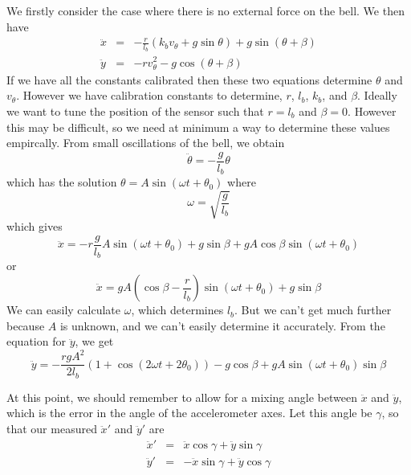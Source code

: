 \documentclass{article}
\begin{document}
We firstly consider the case where there is no external force on the bell. We then have
\begin{eqnarray}
\ddot{x} &=& -\frac{r}{l_b} \left(k_b v_\theta + g\sin \theta \right) 
   + g \sin (\theta + \beta) \\
\ddot{y} &=& -r v_\theta^2 - g \cos (\theta  + \beta)
\end{eqnarray}
If we have all the constants calibrated then these two equations determine $\theta$
and $v_\theta$. However we have calibration constants to determine, $r$, $l_b$,
$k_b$, and $\beta$. Ideally we want to tune the position of the sensor such that
$r = l_b$ and $\beta = 0$. However this may be difficult, so we need at minimum
a way to determine these values empircally.
From small oscillations of the bell, we obtain
\begin{equation}
\ddot{\theta} = - \frac{g}{l_b} \theta
\end{equation}
which has the solution $\theta = A \sin (\omega t + \theta_0)$
where
\begin{equation}
\omega = \sqrt{\frac{g}{l_b}}
\end{equation}
which gives
\begin{equation}
\ddot{x} = - r \frac{g}{l_b} A \sin (\omega t + \theta_0) + g \sin\beta 
+ g A \cos \beta \sin (\omega t + \theta_0)
\end{equation}
or
\begin{equation}
\ddot{x} = gA \left( \cos \beta - \frac{r}{l_b}\right) \sin (\omega t + \theta_0) + g \sin\beta 
\end{equation}
We can easily calculate $\omega$, which determines $l_b$. 
But we can't get much further
because $A$ is unknown, and we can't easily determine it accurately.
From the equation for $\ddot{y}$, we get
\begin{equation}
\ddot{y} = - \frac{rgA^2}{2l_b} (1 + \cos(2\omega t + 2\theta_0)) - g \cos \beta 
+ g A \sin (\omega t + \theta_0) \sin \beta
\end{equation}

At this point, we should remember to allow for a mixing angle between $\ddot{x}$ and $\ddot{y}$, which
is the error in the angle of the accelerometer axes. Let this angle be $\gamma$, so that our measured
$\ddot{x}'$ and $\ddot{y}'$ are
\begin{equation}
\begin{array}{rcl}
\ddot{x}' &=& \ddot{x} \cos \gamma + \ddot{y} \sin \gamma \\
\ddot{y}' &=& -\ddot{x} \sin \gamma + \ddot{y} \cos \gamma \\
\end{array}
\end{equation}
\end{document}
